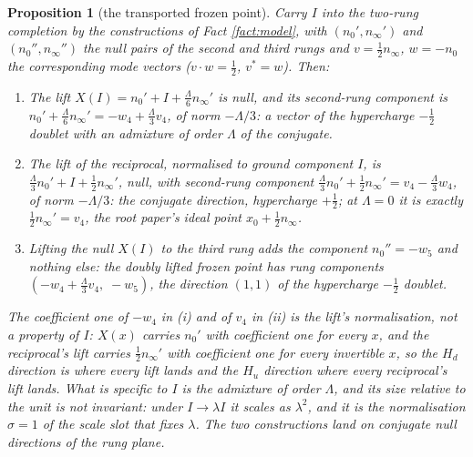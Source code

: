 \documentclass[11pt]{article}
\newtheorem{proposition}[theorem]{Proposition}
\theoremstyle{definition}
\newcommand{\nO}{n_{0}}
\newcommand{\nInf}{n_{\infty}}
\begin{document}
\begin{proposition}[the transported frozen point]\label{prop:lift}
Carry $I$ into the two-rung completion by the constructions of Fact \ref{fact:model}, with $(\nO', \nInf')$ and $(\nO'', \nInf'')$ the null pairs of the second and third rungs and $v = \tfrac12\nInf$, $w = -\nO$ the corresponding mode vectors ($v \cdot w = \tfrac12$, $v^{*} = w$). Then:
\begin{enumerate}
\item[(i)] The lift $X(I) = \nO' + I + \tfrac{\Lambda}{6}\nInf'$ is null, and its second-rung component is $\nO' + \tfrac{\Lambda}{6}\nInf' = -w_{4} + \tfrac{\Lambda}{3}v_{4}$, of norm $-\Lambda/3$: a vector of the hypercharge $-\tfrac12$ doublet with an admixture of order $\Lambda$ of the conjugate.
\item[(ii)] The lift of the reciprocal, normalised to ground component $I$, is $\tfrac{\Lambda}{3}\nO' + I + \tfrac12\nInf'$, null, with second-rung component $\tfrac{\Lambda}{3}\nO' + \tfrac12\nInf' = v_{4} - \tfrac{\Lambda}{3}w_{4}$, of norm $-\Lambda/3$: the conjugate direction, hypercharge $+\tfrac12$; at $\Lambda = 0$ it is exactly $\tfrac12\nInf' = v_{4}$, the root paper's ideal point $x_{0} + \tfrac12\nInf$.
\item[(iii)] Lifting the null $X(I)$ to the third rung adds the component $\nO'' = -w_{5}$ and nothing else: the doubly lifted frozen point has rung components $(-w_{4} + \tfrac{\Lambda}{3}v_{4},\; -w_{5})$, the direction $(1,1)$ of the hypercharge $-\tfrac12$ doublet.
\end{enumerate}
The coefficient one of $-w_{4}$ in (i) and of $v_{4}$ in (ii) is the lift's normalisation, not a property of $I$: $X(x)$ carries $\nO'$ with coefficient one for every $x$, and the reciprocal's lift carries $\tfrac12\nInf'$ with coefficient one for every invertible $x$, so the $H_{d}$ direction is where every lift lands and the $H_{u}$ direction where every reciprocal's lift lands. What is specific to $I$ is the admixture of order $\Lambda$, and its size relative to the unit is not invariant: under $I \to \lambda I$ it scales as $\lambda^{2}$, and it is the normalisation $\sigma = 1$ of the scale slot that fixes $\lambda$. The two constructions land on conjugate null directions of the rung plane.
\end{proposition}
\end{document}
